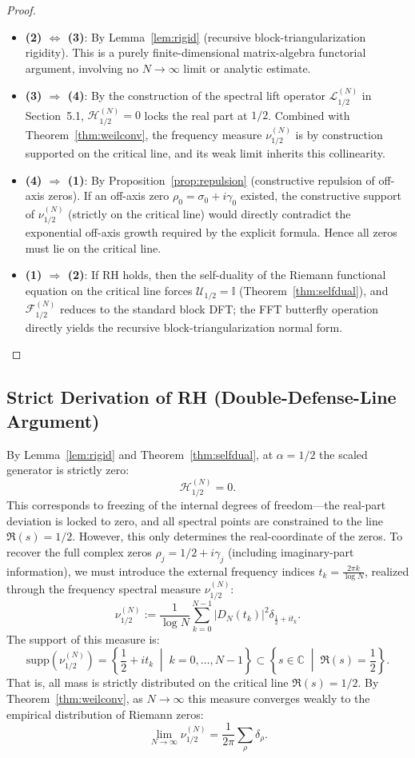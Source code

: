 \documentclass[12pt,a4paper]{amsart}
\theoremstyle{plain}
\theoremstyle{definition}
\theoremstyle{remark}
\begin{document}
\begin{proof}
\begin{itemize}
\item \textbf{(2) $\Leftrightarrow$ (3)}: By Lemma~\ref{lem:rigid} (recursive block-triangularization rigidity). This is a purely finite-dimensional matrix-algebra functorial argument, involving no $N\to\infty$ limit or analytic estimate.
\item \textbf{(3) $\Rightarrow$ (4)}: By the construction of the spectral lift operator $\mathcal{L}_{1/2}^{(N)}$ in Section~5.1, $\mathcal{H}_{1/2}^{(N)}=0$ locks the real part at $1/2$. Combined with Theorem~\ref{thm:weilconv}, the frequency measure $\nu_{1/2}^{(N)}$ is by construction supported on the critical line, and its weak limit inherits this collinearity.
\item \textbf{(4) $\Rightarrow$ (1)}: By Proposition~\ref{prop:repulsion} (constructive repulsion of off-axis zeros). If an off-axis zero $\rho_0=\sigma_0+i\gamma_0$ existed, the constructive support of $\nu_{1/2}^{(N)}$ (strictly on the critical line) would directly contradict the exponential off-axis growth required by the explicit formula. Hence all zeros must lie on the critical line.
\item \textbf{(1) $\Rightarrow$ (2)}: If RH holds, then the self-duality of the Riemann functional equation on the critical line forces $\mathcal{U}_{1/2}=\mathbb{I}$ (Theorem~\ref{thm:selfdual}), and $\mathcal{F}_{1/2}^{(N)}$ reduces to the standard block DFT; the FFT butterfly operation directly yields the recursive block-triangularization normal form.
\end{itemize}
\end{proof}

\subsection{Strict Derivation of RH (Double-Defense-Line Argument)}

By Lemma~\ref{lem:rigid} and Theorem~\ref{thm:selfdual}, at $\alpha=1/2$ the scaled generator is strictly zero:
\[
\mathcal{H}_{1/2}^{(N)}=0.
\]
This corresponds to freezing of the internal degrees of freedom---the real-part deviation is locked to zero, and all spectral points are constrained to the line $\Re(s)=1/2$. However, this only determines the real-coordinate of the zeros. To recover the full complex zeros $\rho_j = 1/2 + i\gamma_j$ (including imaginary-part information), we must introduce the external frequency indices $t_k = \frac{2\pi k}{\log N}$, realized through the frequency spectral measure $\nu_{1/2}^{(N)}$:
\[
\nu_{1/2}^{(N)} := \frac{1}{\log N}\sum_{k=0}^{N-1} |D_N(t_k)|^2 \delta_{\frac{1}{2} + i t_k}.
\]
The support of this measure is:
\[
\mathrm{supp}(\nu_{1/2}^{(N)}) = \left\{\frac{1}{2} + i t_k \;\middle|\; k=0,\dots,N-1\right\} \subset \left\{s\in\mathbb{C} \;\middle|\; \Re(s)=\frac{1}{2}\right\}.
\]
That is, all mass is strictly distributed on the critical line $\Re(s)=1/2$. By Theorem~\ref{thm:weilconv}, as $N\to\infty$ this measure converges weakly to the empirical distribution of Riemann zeros:
\[
\lim_{N\to\infty} \nu_{1/2}^{(N)} = \frac{1}{2\pi}\sum_{\rho} \delta_{\rho}.
\]
\end{document}
